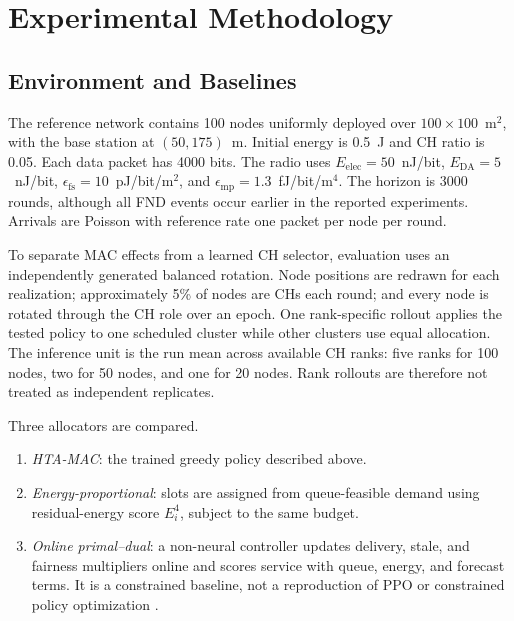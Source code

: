 \documentclass[journal]{IEEEtran}
\newcommand{\method}{HTA-MAC}
\begin{document}
\section{Experimental Methodology}

\subsection{Environment and Baselines}

The reference network contains 100 nodes uniformly deployed over
$100\times100$~m$^2$, with the base station at $(50,175)$~m. Initial energy is
0.5~J and CH ratio is 0.05. Each data packet has 4000 bits. The radio uses
$E_{\mathrm{elec}}=50$~nJ/bit, $E_{\mathrm{DA}}=5$~nJ/bit,
$\epsilon_{\mathrm{fs}}=10$~pJ/bit/m$^2$, and
$\epsilon_{\mathrm{mp}}=1.3$~fJ/bit/m$^4$. The horizon is 3000 rounds, although
all FND events occur earlier in the reported experiments. Arrivals are
Poisson with reference rate one packet per node per round.

To separate MAC effects from a learned CH selector, evaluation uses an
independently generated balanced rotation. Node positions are redrawn for each
realization; approximately 5\% of nodes are CHs each round; and every node is rotated
through the CH role over an epoch. One rank-specific rollout applies the tested
policy to one scheduled cluster while other clusters use equal allocation.
The inference unit is the run mean across available CH ranks: five ranks for
100 nodes, two for 50 nodes, and one for 20 nodes. Rank rollouts are therefore
not treated as independent replicates.

Three allocators are compared.

\begin{enumerate}
\item \emph{\method}: the trained greedy policy described above.
\item \emph{Energy-proportional}: slots are assigned from queue-feasible demand
using residual-energy score $E_i^4$, subject to the same budget.
\item \emph{Online primal--dual}: a non-neural controller updates delivery,
stale, and fairness multipliers online and scores service with queue, energy,
and forecast terms. It is a constrained baseline, not a reproduction of PPO or
constrained policy optimization \cite{altman1999cmdp}.
\end{enumerate}
\end{document}
